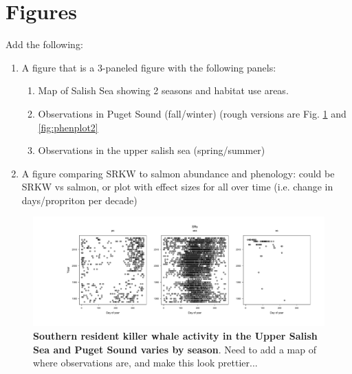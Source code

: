\documentclass{article}
\begin{document}
\section* {Figures}
Add the following:
\begin{enumerate}
\item A figure that is a 3-paneled figure with the following panels: 
\begin{enumerate}
\item Map of Salish Sea showing 2 seasons and habitat use areas.
\item Observations in Puget Sound (fall/winter) (rough versions are Fig. \ref{fig:phenplot} and \ref{fig:phenplot2}
\item Observations in the upper salish sea (spring/summer)
\end{enumerate}
\item A figure comparing SRKW to salmon abundance and phenology: could be SRKW vs salmon, or plot with effect sizes for all over time (i.e. change in days/propriton per decade)
\end{enumerate}
\begin{figure}[p]
\includegraphics{../analyses/figures/OrcaPhenPlots/SRKW_yr_doy.pdf} 
\caption{\textbf{Southern resident killer whale activity in the Upper Salish Sea and Puget Sound varies by season}. Need to add a map of where observations are, and make this look prettier...}
 \label{fig:phenplot}
 \end{figure}
 
\end{document}
